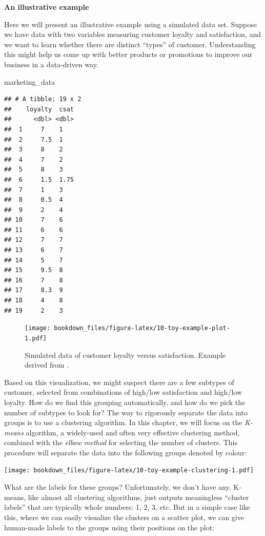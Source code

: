 \documentclass[
]{krantz}
\makeatletter
\newenvironment{Shaded}{\begin{snugshade}}{\end{snugshade}}
\newcommand{\NormalTok}[1]{#1}
\newenvironment{kframe}{%
\medskip{}
\setlength{\fboxsep}{.8em}
 \def\at@end@of@kframe{}%
 \ifinner\ifhmode%
  \def\at@end@of@kframe{\end{minipage}}%
  \begin{minipage}{\columnwidth}%
 \fi\fi%
 \def\FrameCommand##1{\hskip\@totalleftmargin \hskip-\fboxsep
 \colorbox{shadecolor}{##1}\hskip-\fboxsep
     \hskip-\linewidth \hskip-\@totalleftmargin \hskip\columnwidth}%
 \MakeFramed {\advance\hsize-\width
   \@totalleftmargin\z@ \linewidth\hsize
   \@setminipage}}%
 {\par\unskip\endMakeFramed%
 \at@end@of@kframe}
\renewenvironment{Shaded}{\begin{kframe}}{\end{kframe}}
\makeatother
\begin{document}
\textbf{An illustrative example}

Here we will present an illustrative example using a simulated data set. Suppose
we have data with two variables measuring customer loyalty and
satisfaction, and we want to learn whether there are distinct ``types''
of customer. Understanding this might help us come up with better products or
promotions to improve our business in a data-driven way.

\begin{Shaded}
\begin{Highlighting}[]
\NormalTok{marketing\_data}
\end{Highlighting}
\end{Shaded}

\begin{verbatim}
## # A tibble: 19 x 2
##    loyalty  csat
##      <dbl> <dbl>
##  1     7    1   
##  2     7.5  1   
##  3     8    2   
##  4     7    2   
##  5     8    3   
##  6     1.5  1.75
##  7     1    3   
##  8     0.5  4   
##  9     2    4   
## 10     7    6   
## 11     6    6   
## 12     7    7   
## 13     6    7   
## 14     5    7   
## 15     9.5  8   
## 16     7    8   
## 17     8.3  9   
## 18     4    8   
## 19     2    3
\end{verbatim}

\begin{figure}
\centering
\texttt{[image: bookdown\_files/figure-latex/10-toy-example-plot-1.pdf]}
\caption{\label{fig:10-toy-example-plot}Simulated data of customer loyalty versus satisfaction. Example derived from \citet{custexample}.}
\end{figure}

Based on this visualization, we might suspect there are a few subtypes of customer,
selected from combinations of high/low satisfaction and high/low loyalty. How
do we find this grouping automatically, and how do we pick the number of subtypes
to look for? The
way to rigorously separate the data into groups is to use a clustering algorithm.
In this chapter, we will focus on the \emph{K-means} algorithm, a widely-used
and often very effective clustering method, combined with the \emph{elbow method} for
selecting the number of clusters. This procedure will separate the data into
the following groups denoted by colour:

\texttt{[image: bookdown\_files/figure-latex/10-toy-example-clustering-1.pdf]}

What are the labels for these groups? Unfortunately, we don't have any. K-means,
like almost all clustering algorithms, just outputs meaningless ``cluster labels''
that are typically whole numbers: 1, 2, 3, etc. But in a simple case like this,
where we can easily visualize the clusters on a scatter plot, we can give
human-made labels to the groups using their positions on
the plot:
\end{document}
